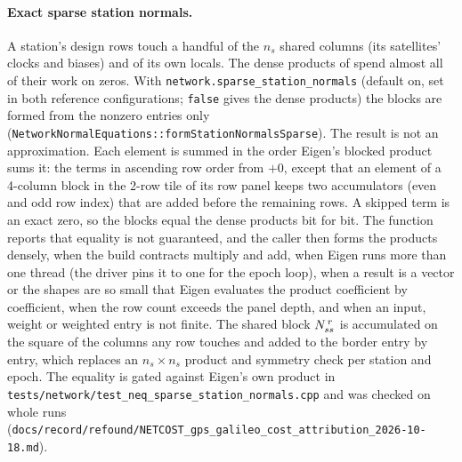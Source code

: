\documentclass[main.tex]{subfiles}
\begin{document}
\paragraph{Exact sparse station normals.}
A station's design rows touch a handful of the $n_s$ shared columns (its
satellites' clocks and biases) and of its own locals. The dense products
of  spend almost all of their work on zeros. With
\texttt{network.sparse\_station\_normals} (default on, set in both
reference configurations; \texttt{false} gives the dense products) the
blocks are formed from the nonzero entries only
(\texttt{NetworkNormalEquations::formStationNormalsSparse}). The result
is not an approximation. Each element is summed in the order Eigen's
blocked product sums it: the terms in ascending row order from $+0$,
except that an element of a 4-column block in the 2-row tile of its row
panel keeps two accumulators (even and odd row index) that are added
before the remaining rows. A skipped term is an exact zero, so the
blocks equal the dense products bit for bit. The function reports that
equality is not guaranteed, and the caller then forms the products
densely, when the build contracts multiply and add, when Eigen runs
more than one thread (the driver pins it to one for the epoch loop), when
a result is a vector or the shapes are so small that Eigen evaluates
the product coefficient by coefficient, when the row count exceeds the
panel depth, and when an input, weight or weighted entry is not finite.
The shared block $N_{ss}^{\,r}$ is accumulated on the square of the
columns any row touches and added to the border entry by entry, which
replaces an $n_s\times n_s$ product and symmetry check per station and
epoch. The equality is gated against Eigen's own product in
\texttt{tests/network/test\_neq\_sparse\_station\_normals.cpp} and was
checked on whole runs
(\texttt{docs/record/refound/NETCOST\_gps\_galileo\_cost\_attribution\_2026-10-18.md}).
\end{document}
